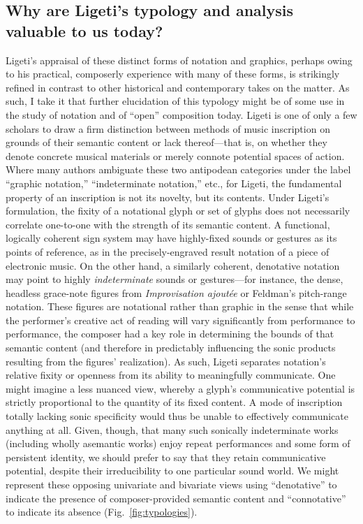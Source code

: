 \subsection{Why are Ligeti's typology and analysis valuable to us today?}

Ligeti's appraisal of these distinct forms of notation and graphics, perhaps owing to his practical, composerly experience with many of these forms, is strikingly refined in contrast to other historical and contemporary takes on the matter. As such, I take it that further elucidation of this typology might be of some use in the study of notation and of ``open'' composition today. Ligeti is one of only a few scholars to draw a firm distinction between methods of music inscription on grounds of their semantic content or lack thereof---that is, on whether they denote concrete musical materials or merely connote potential spaces of action. Where many authors ambiguate these two antipodean categories under the label ``graphic notation,'' ``indeterminate notation,'' etc., for Ligeti, the fundamental property of an inscription is not its novelty, but its contents. Under Ligeti's formulation, the fixity of a notational glyph or set of glyphs does not necessarily correlate one-to-one with the strength of its semantic content. A functional, logically coherent sign system may have highly-fixed sounds or gestures as its points of reference, as in the precisely-engraved result notation of a piece of electronic music. On the other hand, a similarly coherent, denotative notation may point to highly \textit{indeterminate} sounds or gestures---for instance, the dense, headless grace-note figures from \textit{Improvisation ajoutée} or Feldman's pitch-range notation. These figures are notational rather than graphic in the sense that while the performer's creative act of reading will vary significantly from performance to performance, the composer had a key role in determining the bounds of that semantic content (and therefore in predictably influencing the sonic products resulting from the figures' realization). As such, Ligeti separates notation's relative fixity or openness from its ability to meaningfully communicate. One might imagine a less nuanced view, whereby a glyph's communicative potential is strictly proportional to the quantity of its fixed content. A mode of inscription totally lacking sonic specificity would thus be unable to effectively communicate anything at all. Given, though, that many such sonically indeterminate works (including wholly asemantic works) enjoy repeat performances and some form of persistent identity, we should prefer to say that they retain  communicative potential, despite their irreducibility to one particular sound world. We might represent these opposing univariate and bivariate views using ``denotative'' to indicate the presence of composer-provided semantic content and ``connotative'' to indicate its absence (Fig.~\ref{fig:typologies}).

